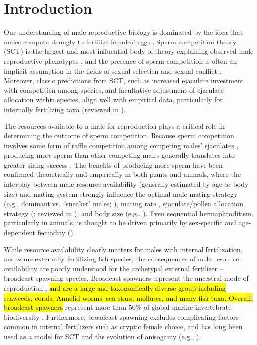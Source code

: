 \documentclass{article}
\begin{document}
\newpage


\section{Introduction}

Our understanding of male reproductive biology is dominated by the idea that males compete strongly to fertilize females' eggs \citep{Bateman1948, Parker1972, Parker1982}. Sperm competition theory (SCT) is the largest and most influential body of theory explaining observed male reproductive phenotypes \citep{Parker1972, Parker1982,Wedell2002}, and the presence of sperm competition is often an implicit assumption in the fields of sexual selection and sexual conflict \citep{BirkheadMoller1998, ArnqvistRowe2005}. Moreover, classic predictions from SCT, such as increased ejaculate investment with competition among species, and facultative adjustment of ejaculate allocation within species, align well with empirical data, particularly for internally fertilizing taxa (reviewed in \citealt{Wedell2002}). 

The resources available to a male for reproduction plays a critical role in determining the outcome of sperm competition. Because sperm competition involves some form of raffle competition among competing males' ejaculates \citep{Wedell2002, ArnqvistRowe2005}, producing more sperm than other competing males generally translates into greater siring success \citep{Parker1972, Parker1982, Wedell2002}. The benefits of producing more sperm have been confirmed theoretically and empirically in both plants and animals, where the interplay between male resource availability (generally estimated by age or body size) and mating system strongly influence the optimal male mating strategy (e.g., dominant vs.~'sneaker' males; \citealt{Parker1990a,Parker1990b,GageEtAl1995}), mating rate \citep{Parker1990b, BirkheadMoller1998, Wedell2002}, ejaculate/pollen allocation strategy (\citealt{FriedmanBarrett2009}; reviewed in \citealt{Wedell2002, Zhang2006}), and body size (e.g., \citealt{ArnoldWade1984}). Even sequential hermaphroditism, particularly in animals, is thought to be driven primarily by sex-specific and age-dependent fecundity (\citealt{Ghiselin1969, Warner1975, Warner1988, MundayWarner2006}).

While resource availability clearly matters for males with internal fertilization, and some externally fertilizing fish species, the consequences of male resource availability are poorly understood for the archetypal external fertilizer -- broadcast spawning species. Broadcast spawners represent the ancestral mode of reproduction \citep{RouFitz1994}, \hl{and are a large and taxonomically diverse group including seaweeds, corals, Annelid worms, sea stars, molluscs, and many fish taxa. Overall, broadcast spawners} represent more than 50\% of global marine invertebrate biodiversity \citep{MonroMarshall2015}. Furthermore, broadcast spawning excludes complicating factors common in internal fertilizers such as cryptic female choice, and has long been used as a model for SCT and the evolution of anisogamy (e.g., \citealt{Parker1972, Parker1982,Parker2017}). 
\end{document}
